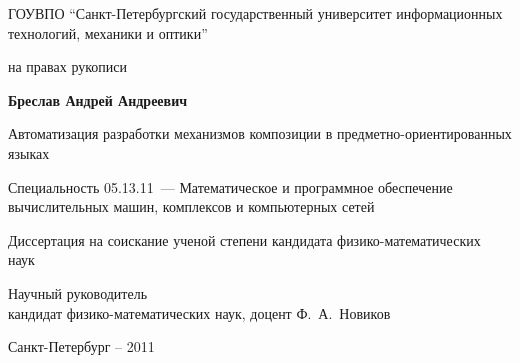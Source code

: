 \thispagestyle{empty}
\begin{center}\Large 
ГОУВПО ``Санкт-Петербургский государственный университет информационных технологий, механики и оптики''
\end{center}
\vfill

\begin{flushright}\Large
на правах рукописи
\end{flushright}
\vfill

\begin{center}\Large\bf
Бреслав Андрей Андреевич
\end{center}
\vfill

\begin{center}\Large
Автоматизация разработки механизмов композиции в предметно-ориентированных языках
\end{center}
\vfill

\begin{center}\Large
Специальность 05.13.11~--- Математическое и
программное обеспечение вычислительных машин, комплексов и
компьютерных сетей
\end{center}
\vfill

\begin{center}\Large
Диссертация на соискание ученой степени 
кандидата физико-математических наук
\end{center}
\vfill

\hfill
\begin{minipage}{0.7\textwidth}
\begin{flushleft}\Large
Научный руководитель \\
кандидат физико-математических
наук, доцент Ф.~А.~Новиков
\end{flushleft}
\end{minipage}
\vfill

\begin{center}\Large
Санкт-Петербург -- 2011
\end{center}
\newpage